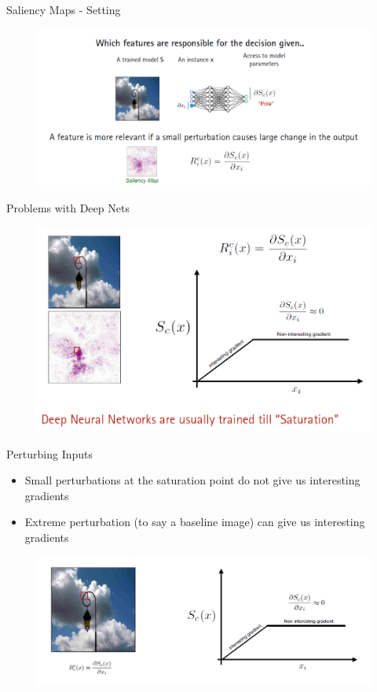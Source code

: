 \documentclass[11pt,compress,t,notes=noshow, aspectratio=169, xcolor=table]{beamer}
\begin{document}
\begin{frame}{Saliency Maps - Setting}
    \begin{figure}
        \centering
        \includegraphics[scale=.4]{bild21}
    \end{figure}
\end{frame}

\begin{frame}{Problems with Deep Nets}

    \begin{figure}
        \centering
        \includegraphics[width=0.6\linewidth]{bild22}
    \end{figure}
\end{frame}

\begin{frame}{Perturbing Inputs}
\begin{itemize}
    \item Small perturbations at the saturation point do not give us interesting gradients
    \item Extreme perturbation (to say a baseline image) can give us interesting gradients
\end{itemize}
\begin{figure}
    \centering
    \includegraphics[scale=.5]{bild23}
\end{figure}
\end{frame}
\end{document}
